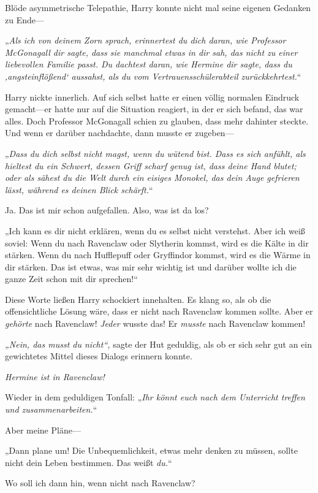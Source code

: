 {Blöde asymmetrische Telepathie, Harry konnte nicht mal seine eigenen Gedanken zu Ende—

„\emph{Als ich von deinem Zorn sprach, erinnertest du dich daran, wie Professor McGonagall dir sagte, dass sie manchmal etwas in dir sah, das nicht zu einer liebevollen Familie passt. Du dachtest daran, wie Hermine dir sagte, dass du ‚angsteinflößend` aussahst, als du vom Vertrauensschülerabteil zurückkehrtest.}“

Harry nickte innerlich. Auf sich selbst hatte er einen völlig normalen Eindruck gemacht—er hatte nur auf die Situation reagiert, in der er sich befand, das war alles. Doch Professor McGonagall schien zu glauben, dass mehr dahinter steckte. Und wenn er darüber nachdachte, dann musste er zugeben—

„\emph{Dass du dich selbst nicht magst, wenn du wütend bist. Dass es sich anfühlt, als hieltest du ein Schwert, dessen Griff scharf genug ist, dass deine Hand blutet; oder als sähest du die Welt durch ein eisiges Monokel, das dein Auge gefrieren lässt, während es deinen Blick schärft.}“

Ja. Das ist mir schon aufgefallen. Also, was ist da los?

„Ich kann es dir nicht erklären, wenn du es selbst nicht verstehst. Aber ich weiß soviel: Wenn du nach Ravenclaw oder Slytherin kommst, wird es die Kälte in dir stärken. Wenn du nach Hufflepuff oder Gryffindor kommst, wird es die Wärme in dir stärken. Das ist etwas, was mir sehr wichtig ist und darüber wollte ich die ganze Zeit schon mit dir sprechen!“

Diese Worte ließen Harry schockiert innehalten. Es klang so, als ob die offensichtliche Lösung wäre, dass er nicht nach Ravenclaw kommen sollte. Aber er \emph{gehörte} nach Ravenclaw! \emph{Jeder} wusste das! Er \emph{musste} nach Ravenclaw kommen!

\emph{„Nein, das musst du nicht“,} sagte der Hut geduldig, als ob er sich sehr gut an ein gewichtetes Mittel dieses Dialogs erinnern konnte.

\emph{Hermine ist in Ravenclaw!}

Wieder in dem geduldigen Tonfall: „\emph{Ihr könnt euch nach dem Unterricht treffen und zusammenarbeiten.}“

Aber meine Pläne—

„Dann plane um! Die Unbequemlichkeit, etwas mehr denken zu müssen, sollte nicht dein Leben bestimmen. Das weißt \emph{du.}“

Wo soll ich dann hin, wenn nicht nach Ravenclaw?

}
